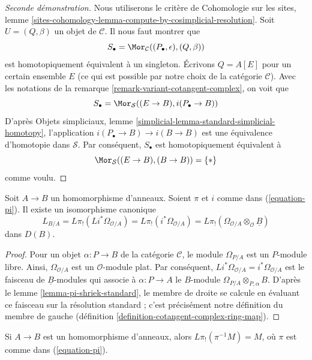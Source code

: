 \begin{proof}[Seconde démonstration]
Nous utiliserons le critère de Cohomologie sur les sites, lemme
\ref{sites-cohomology-lemma-compute-by-cosimplicial-resolution}.
Soit $U = (Q, \beta)$ un objet de $\mathcal{C}$.
Il nous faut montrer que
$$
S_\bullet = \Mor_\mathcal{C}((P_\bullet, \epsilon), (Q, \beta))
$$
est homotopiquement équivalent à un singleton. Écrivons $Q = A[E]$ pour un
certain ensemble $E$ (ce qui est possible par notre choix de la catégorie
$\mathcal{C}$). Avec les notations de la remarque
\ref{remark-variant-cotangent-complex}, on voit que
$$
S_\bullet = \Mor_\mathcal{S}((E \to B), i(P_\bullet \to B))
$$
D'après Objets simpliciaux, lemme
\ref{simplicial-lemma-standard-simplicial-homotopy}, l'application
$i(P_\bullet \to B) \to i(B \to B)$ est une équivalence d'homotopie dans
$\mathcal{S}$. Par conséquent, $S_\bullet$ est homotopiquement équivalent à
$$
\Mor_\mathcal{S}((E \to B), (B \to B)) = \{*\}
$$
comme voulu.
\end{proof}

\begin{lemma}
\label{lemma-compute-cotangent-complex}
Soit $A \to B$ un homomorphisme d'anneaux. Soient $\pi$ et $i$ comme dans
(\ref{equation-pi}). Il existe un isomorphisme canonique
$$
L_{B/A} = L\pi_!(Li^*\Omega_{\mathcal{O}/A}) =
L\pi_!(i^*\Omega_{\mathcal{O}/A}) =
L\pi_!(\Omega_{\mathcal{O}/A} \otimes_\mathcal{O} \underline{B})
$$
dans $D(B)$.
\end{lemma}

\begin{proof}
Pour un objet $\alpha : P \to B$ de la catégorie $\mathcal{C}$, le module
$\Omega_{P/A}$ est un $P$-module libre. Ainsi,
$\Omega_{\mathcal{O}/A}$ est un $\mathcal{O}$-module plat. Par conséquent,
$Li^*\Omega_{\mathcal{O}/A} = i^*\Omega_{\mathcal{O}/A}$ est le faisceau de
$\underline{B}$-modules qui associe à $\alpha : P \to A$ le $B$-module
$\Omega_{P/A} \otimes_{P, \alpha} B$. D'après le lemme
\ref{lemma-pi-shriek-standard}, le membre de droite se calcule en évaluant ce
faisceau sur la résolution standard ; c'est précisément notre définition du
membre de gauche (définition \ref{definition-cotangent-complex-ring-map}).
\end{proof}

\begin{lemma}
\label{lemma-pi-lower-shriek-constant-sheaf}
Si $A \to B$ est un homomorphisme d'anneaux, alors
$L\pi_!(\pi^{-1}M) = M$, où $\pi$ est comme dans (\ref{equation-pi}).
\end{lemma}

